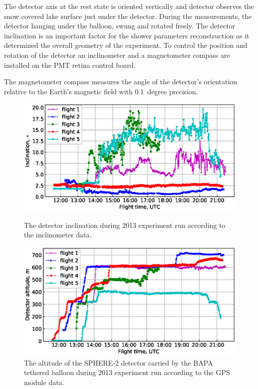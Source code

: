 \documentclass[final,5p,times,twocolumn]{elsarticle}
\begin{document}
The detector axis at the rest state is oriented vertically and detector observes the snow covered lake surface just under the detector. During the measurements, the detector hanging under the balloon, swung and rotated freely. The detector inclination is an important factor for the shower parameters reconstruction as it determined the overall geometry of the experiment. To control the position and rotation of the detector an inclinometer and a magnetometer compass are installed on the PMT retina control board. 

The magnetometer compass measures the angle of the detector's orientation relative to the Earth's magnetic field with 0.1~degree precision.

\begin{figure}[tb]
    \begin{minipage}{0.48\textwidth}
    \centering
    \includegraphics[width=\textwidth]{figs/ClinTh.eps}
    \caption{The detector inclination during 2013 experiment run according to the inclinometer data.}
    \label{fig:inclination} 
    \end{minipage}
    \hfill
    \begin{minipage}{0.48\textwidth}
    \centering
    \includegraphics[width=\textwidth]{figs/height.eps}
    \caption{The altitude of the SPHERE-2 detector carried by the BAPA tethered balloon during 2013 experiment run according to the GPS module data.}
    \label{fig:height}
    \end{minipage}


\end{figure}
\end{document}
